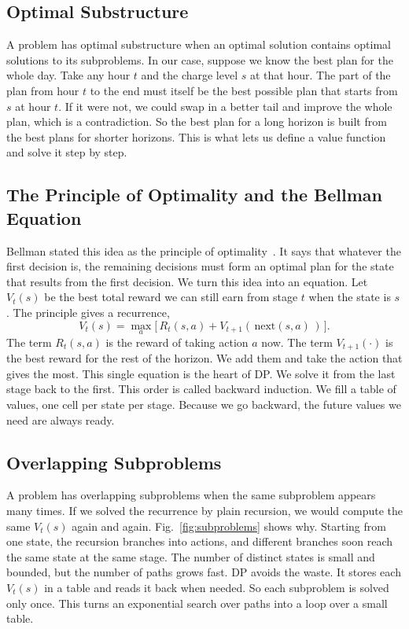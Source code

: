 \documentclass[conference,a4paper]{IEEEtran}
\begin{document}
\subsection{Optimal Substructure}
A problem has optimal substructure when an optimal solution contains optimal
solutions to its subproblems. In our case, suppose we know the best plan for
the whole day. Take any hour $t$ and the charge level $s$ at that hour. The
part of the plan from hour $t$ to the end must itself be the best possible plan
that starts from $s$ at hour $t$. If it were not, we could swap in a better
tail and improve the whole plan, which is a contradiction. So the best plan for
a long horizon is built from the best plans for shorter horizons. This is what
lets us define a value function and solve it step by step.

\subsection{The Principle of Optimality and the Bellman Equation}
Bellman stated this idea as the principle of optimality~\cite{bellman1957}. It
says that whatever the first decision is, the remaining decisions must form an
optimal plan for the state that results from the first decision. We turn this
idea into an equation. Let $V_t(s)$ be the best total reward we can still earn
from stage $t$ when the state is $s$. The principle gives a recurrence,
\begin{equation}
V_t(s) = \max_{a}\big[\, R_t(s,a) + V_{t+1}(\,\mathrm{next}(s,a)\,) \,\big].
\label{eq:bellman-general}
\end{equation}
The term $R_t(s,a)$ is the reward of taking action $a$ now. The term
$V_{t+1}(\cdot)$ is the best reward for the rest of the horizon. We add them and
take the action that gives the most. This single equation is the heart of DP.
We solve it from the last stage back to the first. This order is called
backward induction. We fill a table of values, one cell per state per stage.
Because we go backward, the future values we need are always ready.

\subsection{Overlapping Subproblems}
A problem has overlapping subproblems when the same subproblem appears many
times. If we solved the recurrence by plain recursion, we would compute the
same $V_t(s)$ again and again. Fig.~\ref{fig:subproblems} shows why. Starting
from one state, the recursion branches into actions, and different branches
soon reach the same state at the same stage. The number of distinct states is
small and bounded, but the number of paths grows fast. DP avoids the waste. It
stores each $V_t(s)$ in a table and reads it back when needed. So each
subproblem is solved only once. This turns an exponential search over paths
into a loop over a small table.
\end{document}
